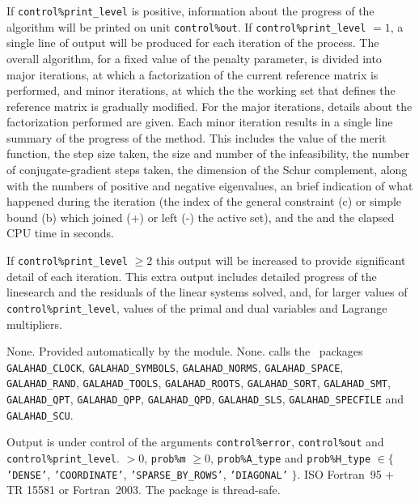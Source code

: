 \documentclass{galahad}
\newcommand{\packagename}{QPA}
\begin{document}

\galinfo
If {\tt control\%print\_level} is positive, information about the progress 
of the algorithm will be printed on unit {\tt control\-\%out}.
If {\tt control\%print\_level} $= 1$, a single line of output will be produced 
for each iteration of the process. 
The overall algorithm, for a fixed value of the penalty parameter, 
is divided into major iterations, at which 
a factorization of the current reference matrix is performed, and
minor iterations, at which the the working set that defines the
reference matrix is gradually modified.
For the major iterations, details about the factorization performed are given.
Each minor iteration results in a single line summary of the
progress of the method. This includes the value of the merit function,
the step size taken, the size and number of the infeasibility, the
number of conjugate-gradient steps taken, the dimension of the
Schur complement, along with the numbers of positive and negative eigenvalues,
an brief indication of what happened during the iteration (the index of the
general constraint (c) or simple bound (b) which joined (+) or left (-) 
the active set), and the 
and the elapsed CPU time in seconds. 

If {\tt control\%print\_level} $\geq 2$ this 
output will be increased to provide significant detail of each iteration. 
This extra output includes detailed progress of the linesearch and the
residuals of the linear systems solved, and,
for larger values of {\tt control\%print\_level}, values of the primal and dual
variables and Lagrange multipliers. 


\galgeneral

\galcommon None.
\galworkspace Provided automatically by the module.
\galroutines None. 
\galmodules {\tt \packagename\_solve} calls the \galahad\ packages
\sloppy
{\tt GALAHAD\_\-CLOCK},
{\tt GALAHAD\_SY\-M\-BOLS}, 
{\tt GALAHAD\_NORMS}, 
{\tt GALAHAD\_SPACE}, 
{\tt GALAHAD\_RA\-ND}, 
{\tt GALAHAD\_TOOLS}, 
{\tt GALAHAD\_ROOTS}, 
{\tt GALAHAD\_SORT},
{\tt GALAHAD\_SMT}, 
{\tt GALAHAD\_QPT},
{\tt GALAHAD\_QPP},
{\tt GALAHAD\_QPD},
{\tt GALAHAD\_SLS}, 
{\tt GALAHAD\_SPECFILE}
and
{\tt GALAHAD\_SCU}.

\galio Output is under control of the arguments
 {\tt control\%error}, {\tt control\%out} and {\tt control\%print\_level}.
 $> 0$, {\tt prob\%m} $\geq  0$, 
{\tt prob\%A\_type} and {\tt prob\%H\_type} $\in \{${\tt 'DENSE'}, 
 {\tt 'COORDINATE'}, {\tt 'SPARSE\_BY\_ROWS'}, {\tt 'DIAGONAL'} $\}$. 
\galportability ISO Fortran~95 + TR 15581 or Fortran~2003. 
The package is thread-safe.
\end{document}
